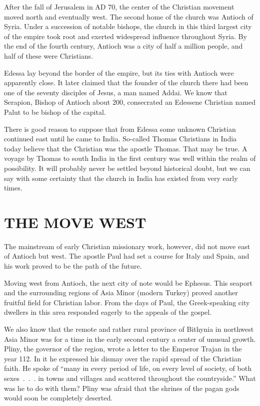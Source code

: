 After the fall of Jerusalem in AD 70, the center of the Christian movement moved north and
eventually west. The second home of the church was Antioch of Syria. Under a succession of notable
bishops, the church in this third largest city of the empire took root and exerted widespread
influence throughout Syria. By the end of the fourth century, Antioch was a city of half a million
people, and half of these were Christians.

Edessa lay beyond the border of the empire, but its ties with Antioch were apparently close. It
later claimed that the founder of the church there had been one of the seventy disciples of Jesus, a
man named Addai. We know that Serapion, Bishop of Antioch about 200, consecrated an Edessene
Christian named Palut to be bishop of the capital.

There is good reason to suppose that from Edessa some unknown Christian continued east until he came
to India. So-called Thomas Christians in India today believe that the Christian was the apostle
Thomas. That may be true. A voyage by Thomas to south India in the first century was well within the
realm of possibility. It will probably never be settled beyond historical doubt, but we can say with
some certainty that the church in India has existed from very early times.

\section{THE MOVE WEST}

The mainstream of early Christian missionary work, however, did not move east of Antioch but west.
The apostle Paul had set a course for Italy and Spain, and his work proved to be the path of the
future.

Moving west from Antioch, the next city of note would be Ephesus. This seaport and the surrounding
regions of Asia Minor (modern Turkey) proved another fruitful field for Christian labor. From the
days of Paul, the Greek-speaking city dwellers in this area responded eagerly to the appeals of the
gospel.

We also know that the remote and rather rural province of Bithynia in northwest Asia Minor was for a
time in the early second century a center of unusual growth. Pliny, the governor of the region,
wrote a letter to the Emperor Trajan in the year 112. In it he expressed his dismay over the rapid
spread of the Christian faith. He spoke of “many in every period of life, on every level of society,
of both sexes~.~.~. in towns and villages and scattered throughout the countryside.” What was he to
do with them? Pliny was afraid that the shrines of the pagan gods would soon be completely deserted.

